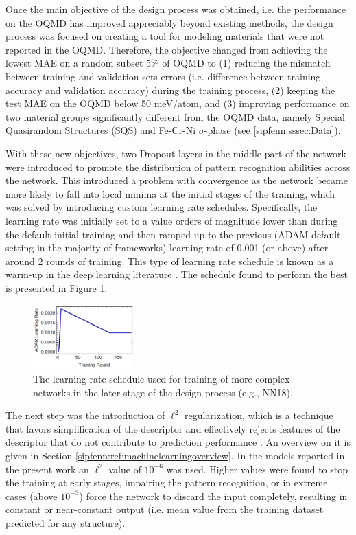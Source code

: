Once the main objective of the design process was obtained, i.e. the performance on the OQMD has improved appreciably beyond existing methods, the design process was focused on creating a tool for modeling materials that were not reported in the OQMD. Therefore, the objective changed from achieving the lowest MAE on a random subset 5\% of OQMD to (1) reducing the mismatch between training and validation sets errors (i.e. difference between training accuracy and validation accuracy) during the training process, (2) keeping the test MAE on the OQMD below 50 meV/atom, and (3) improving performance on two material groups significantly different from the OQMD data, namely Special Quasirandom Structures (SQS) and Fe-Cr-Ni $\sigma$-phase (see \ref{sipfenn:sssec:Data}).

With these new objectives, two Dropout layers in the middle part of the network were introduced to promote the distribution of pattern recognition abilities across the network. \cite{Srivastava2014Dropout:Overfitting} This introduced a problem with convergence as the network became more likely to fall into local minima at the initial stages of the training, which was solved by introducing custom learning rate schedules. Specifically, the learning rate was initially set to a value orders of magnitude lower than during the default initial training and then ramped up to the previous (ADAM default setting in the majority of frameworks) learning rate of 0.001 (or above) after around 2 rounds of training. This type of learning rate schedule is known as a warm-up in the deep learning literature \cite{gotmare2018closer}. The schedule found to perform the best is presented in Figure \ref{sipfenn:fig:learningrate}.

\begin{figure}
\centering
    \includegraphics[width=0.35\textwidth]{sipfenn/nn18_learningrate_linonly.png}
    \caption{The learning rate schedule used for training of more complex networks in the later stage of the design process (e.g., NN18).}
    \label{sipfenn:fig:learningrate}
\end{figure}


The next step was the introduction of $\ell^2$ regularization, which is a technique that favors simplification of the descriptor and effectively rejects features of the descriptor that do not contribute to prediction performance \cite{L2Regularization}. An overview on it is given in Section \ref{sipfenn:ref:machinelearningoverview}. In the models reported in the present work an $\ell^2$ value of $10^{-6}$ was used. Higher values were found to stop the training at early stages, impairing the pattern recognition, or in extreme cases (above $10^{-3}$) force the network to discard the input completely, resulting in constant or near-constant output (i.e. mean value from the training dataset predicted for any structure).

